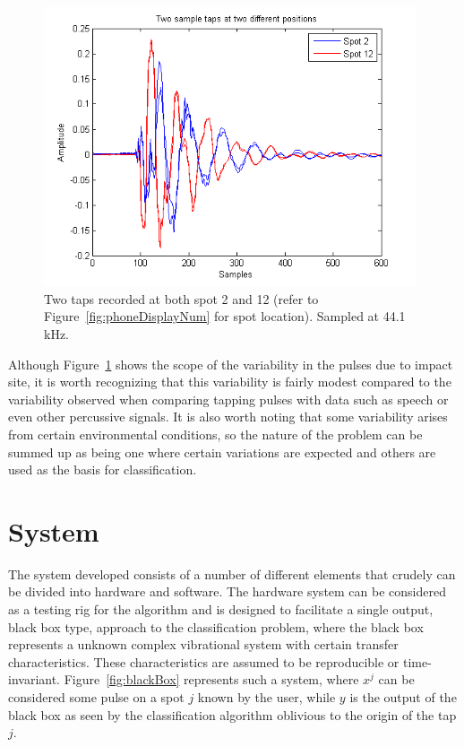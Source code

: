 \begin{figure}[t]
  \begin{center}
    \includegraphics[width=110mm]{twotwoSampleTap}
    \caption{Two taps recorded at both spot 2 and 12 (refer to Figure~\ref{fig:phoneDisplayNum} for spot location). Sampled at 44.1 kHz.}\label{fig:twotwoSampleTap}
  \end{center}
\end{figure}

Although Figure~\ref{fig:twotwoSampleTap} shows the scope of the variability in the pulses due to impact site, it is worth recognizing that this variability is fairly modest compared to the variability observed when comparing tapping pulses with data such as speech or even other percussive signals. It is also worth noting that some variability arises from certain environmental conditions, so the nature of the problem can be summed up as being one where certain variations are expected and others are used as the basis for classification.

\section{System}\label{sec:APRsystem}
The system developed consists of a number of different elements that crudely can be divided into hardware and software. The hardware system can be considered as a testing rig for the algorithm and is designed to facilitate a single output, black box type, approach to the classification problem, where the black box represents a unknown complex vibrational system with certain transfer characteristics. These characteristics are assumed to be reproducible or time-invariant. Figure~\ref{fig:blackBox} represents such a system, where $x^j$ can be considered some pulse on a spot $j$ known by the user, while $y$ is the output of the black box as seen by the classification algorithm oblivious to the origin of the tap $j$.


